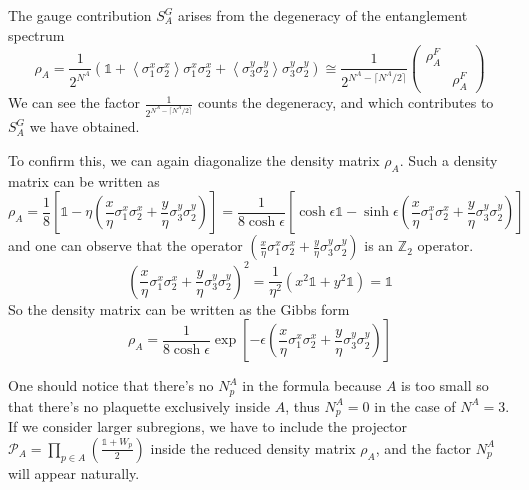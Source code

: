 \documentclass[12font]{article}
\theoremstyle{definition}
\newcommand{\anglelr}[1]{\left\langle #1 \right\rangle}
\newcommand{\lr}[1]{\left(  #1  \right)}
\newcommand{\lrm}[1]{\left[  #1  \right]}
\begin{document}
The gauge contribution $S^G_A$ arises from the degeneracy of the entanglement spectrum
\[
\rho_A = \frac{1}{2^{N^A}}\lr{\mathds{1}+\anglelr{\sigma^x_1\sigma^x_2}\sigma^x_1\sigma^x_2 + \anglelr{\sigma^y_3\sigma^y_2}\sigma^y_3\sigma^y_2} \cong \frac{1}{2^{N^A-\lceil N^A/2\rceil}}\begin{pmatrix}
                                      \rho^F_A & \; \\
                                      \; & \rho^F_A 
                                    \end{pmatrix}
\]
We can see the factor $\frac{1}{2^{N^A-\lceil N^A/2\rceil}}$ counts the degeneracy, and which contributes to $S^G_A$ we have obtained. 

To confirm this, we can again diagonalize the density matrix $\rho_A$. Such a density matrix can be written as
\[
\rho_A = \frac{1}{8}\lrm{\mathds{1} - \eta\lr{\frac{x}{\eta}\sigma^x_1\sigma^x_2 + \frac{y}{\eta}\sigma^y_3\sigma^y_2}} = \frac{1}{8\cosh\epsilon}\lrm{\cosh\epsilon\mathds{1} - \sinh\epsilon\lr{\frac{x}{\eta}\sigma^x_1\sigma^x_2 + \frac{y}{\eta}\sigma^y_3\sigma^y_2}}
\]
and one can observe that the operator $\lr{\frac{x}{\eta}\sigma^x_1\sigma^x_2 + \frac{y}{\eta}\sigma^y_3\sigma^y_2}$ is an $\mathbb{Z}_2$ operator. 
\[
\lr{\frac{x}{\eta}\sigma^x_1\sigma^x_2 + \frac{y}{\eta}\sigma^y_3\sigma^y_2}^2 = \frac{1}{\eta^2}\lr{x^2\mathds{1} + y^2\mathds{1}} = \mathds{1}
\]
So the density matrix can be written as the Gibbs form
\[
    \rho_A = \frac{1}{8\cosh\epsilon}\exp\lrm{-\epsilon\lr{\frac{x}{\eta}\sigma^x_1\sigma^x_2 + \frac{y}{\eta}\sigma^y_3\sigma^y_2}}
\]


One should notice that there's no $N_p^A$ in the formula because $A$ is too small so that there's no plaquette exclusively inside $A$, thus $N^A_p=0$ in the case of $N^A=3$. If we consider larger subregions, we have to include the projector $\mathcal{P}_A=\prod_{p\in A}\lr{\frac{\mathds{1}+W_p}{2}}$ inside the reduced density matrix $\rho_A$, and the factor $N^A_p$ will appear naturally.
\end{document}
